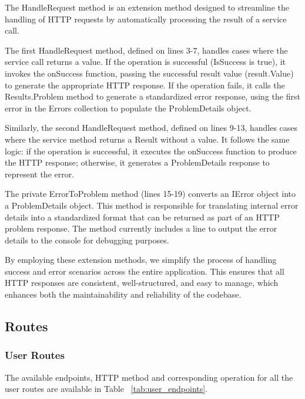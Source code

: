 The HandleRequest method is an extension method designed to streamline the handling of HTTP requests by automatically processing the result of a service call.

The first HandleRequest method, defined on lines 3-7, handles cases where the service call returns a value. If the operation is successful (IsSuccess is true), it invokes the onSuccess function, passing the successful result value (result.Value) to generate the appropriate HTTP response. If the operation fails, it calls the Results.Problem method to generate a standardized error response, using the first error in the Errors collection to populate the ProblemDetails object.

Similarly, the second HandleRequest method, defined on lines 9-13, handles cases where the service method returns a Result without a value. It follows the same logic: if the operation is successful, it executes the onSuccess function to produce the HTTP response; otherwise, it generates a ProblemDetails response to represent the error.

The private ErrorToProblem method (lines 15-19) converts an IError object into a ProblemDetails object. This method is responsible for translating internal error details into a standardized format that can be returned as part of an HTTP problem response. The method currently includes a line to output the error details to the console for debugging purposes.

By employing these extension methods, we simplify the process of handling success and error scenarios across the entire application. This ensures that all HTTP responses are consistent, well-structured, and easy to manage, which enhances both the maintainability and reliability of the codebase.

\newpage

\subsection{Routes}

\subsubsection{User Routes}
The available endpoints, HTTP method and corresponding operation for all the user routes are available in Table ~\ref{tab:user_endpoints}. 

